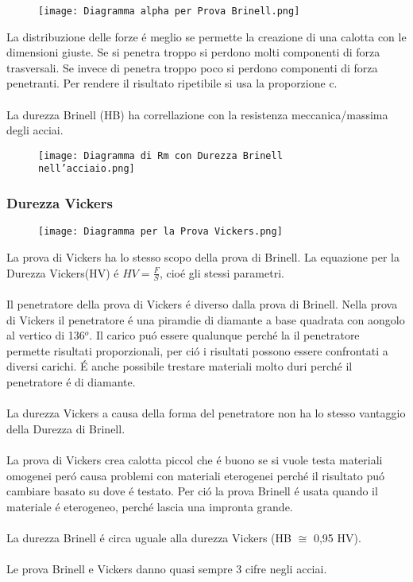 \documentclass{article}
\begin{document}
{                    \begin{figure}[!h]
                        \centering
                        \texttt{[image: Diagramma alpha per Prova Brinell.png]}
                    \end{figure}
                    La distribuzione delle forze \'e meglio se permette la creazione di una calotta con le dimensioni giuste. Se si penetra troppo si perdono molti componenti di forza trasversali. Se invece di penetra troppo poco si perdono componenti di forza penetranti. Per rendere il risultato ripetibile si usa la proporzione c.\\ \\
                    La durezza Brinell (HB) ha correllazione con la resistenza meccanica/massima degli acciai.
                    \begin{figure}[!h]
                        \centering
                        \texttt{[image: Diagramma di Rm con Durezza Brinell nell'acciaio.png]}
                    \end{figure}
                \subsubsection{Durezza Vickers}
                    \begin{figure}[!h]
                        \centering
                        \texttt{[image: Diagramma per la Prova Vickers.png]}
                    \end{figure}
                    La prova di Vickers ha lo stesso scopo della prova di Brinell.
                    La equazione per la Durezza Vickers(HV) \'e $HV = \frac{F}{S}$, cio\'e gli stessi parametri.\\ \\
                    Il penetratore della prova di Vickers \'e diverso dalla prova di Brinell. Nella prova di Vickers il penetratore \'e una piramdie di diamante a base quadrata con aongolo al vertico di 136$^o$. Il carico pu\'o essere qualunque perch\'e la il penetratore permette risultati proporzionali, per ci\'o i risultati possono essere confrontati a diversi carichi. \'E anche possibile trestare materiali molto duri perch\'e il penetratore \'e di diamante.\\ \\
                    La durezza Vickers a causa della forma del penetratore non ha lo stesso vantaggio della Durezza di Brinell.\\ \\
                    La prova di Vickers crea calotta piccol che \'e buono se si vuole testa materiali omogenei per\'o causa problemi con materiali eterogenei perch\'e il risultato pu\'o cambiare basato su dove \'e testato. Per ci\'o la prova Brinell \'e usata quando il materiale \'e eterogeneo, perch\'e lascia una impronta grande.\\ \\
                    La durezza Brinell \'e circa uguale alla durezza Vickers (HB $\cong$ 0,95 HV). \\ \\
                    Le prova Brinell e Vickers danno quasi sempre 3 cifre negli acciai.
}
\end{document}

